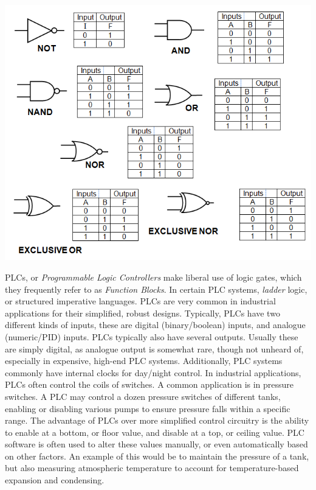 \documentclass[11pt,a4paper]{article}
\begin{document}
\begin{center}
\includegraphics[width=\textwidth]{gates.png}
\end{center}

PLCs, or \textit{Programmable Logic Controllers} make liberal use of logic gates, which they frequently refer to as \textit{Function Blocks}. In certain PLC systems, \textit{ladder} logic, or structured imperative languages. PLCs are very common in industrial applications for their simplified, robust designs. Typically, PLCs have two different kinds of inputs, these are digital (binary/boolean) inputs, and analogue (numeric/PID) inputs. PLCs typically also have several outputs. Usually these are simply digital, as analogue output is somewhat rare, though not unheard of, especially in expensive, high-end PLC systems. Additionally, PLC systems commonly have internal clocks for day/night control. In industrial applications, PLCs often control the coils of switches. A common application is in pressure switches. A PLC may control a dozen pressure switches of different tanks, enabling or disabling various pumps to ensure pressure falls within a specific range. The advantage of PLCs over more simplified control circuitry is the ability to enable at a bottom, or floor value, and disable at a top, or ceiling value. PLC software is often used to alter these values manually, or even automatically based on other factors. An example of this would be to maintain the pressure of a tank, but also measuring atmospheric temperature to account for temperature-based expansion and condensing.
\end{document}
